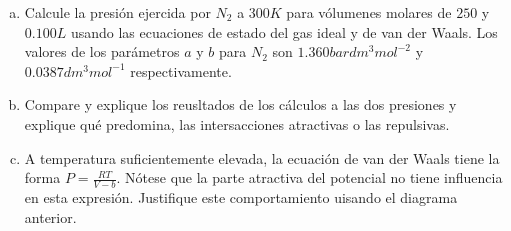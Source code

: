 \documentclass{article}
\begin{document}
\begin{enumerate}[a)]
    \item Calcule la presión ejercida por $N_2$ a $300K$ para vólumenes molares de 
    $250$ y $0.100L$ usando las ecuaciones de estado del gas ideal y de van der Waals.
    Los valores de los parámetros $a$ y $b$ para $N_2$ son $1.360bar dm^3 mol^{-2}$ y
    $0.0387 dm^3 mol^{-1}$ respectivamente. 
    
    \item Compare y explique los reusltados de los cálculos a las dos presiones y 
    explique qué predomina, las intersacciones atractivas o las repulsivas.

    \item A temperatura suficientemente elevada, la ecuación de van der Waals tiene 
    la forma $P = \frac{RT}{V-b}$. Nótese que la parte atractiva del potencial no tiene 
    influencia en esta expresión. Justifique este comportamiento uisando el diagrama 
    anterior.
\end{enumerate}
\end{document}
